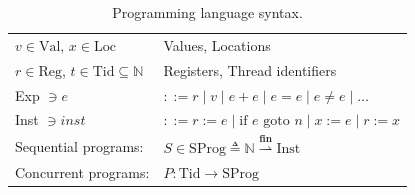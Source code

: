 \begin{table}[h]
    \centering
    \renewcommand{\arraystretch}{1.2}  %
    \begin{tabular}{l l}
        $v \in \text{Val}$, $x \in \text{Loc}$ & Values, Locations \\
        $r \in \text{Reg}$, $t \in \text{Tid} \subseteq \mathbb{N}$ & Registers, Thread identifiers \\
        Exp $\ni e$ & $::= r \mid v \mid e + e \mid e = e \mid e \neq e \mid \dots$ \\
        Inst $\ni inst$ & $::= r := e \mid \text{if } e \text{ goto } n \mid x := e \mid r := x$ \\
        Sequential programs: & $S \in \text{SProg} \triangleq \mathbb{N} \overset{\mathbf{fin}}{\rightharpoonup} \text{Inst}$ \\
        Concurrent programs: & $P : \text{Tid} {\to}
 \text{SProg}$ \\
    \end{tabular}
    \vspace{0.1in }
    \caption{Programming language syntax.}
\end{table}